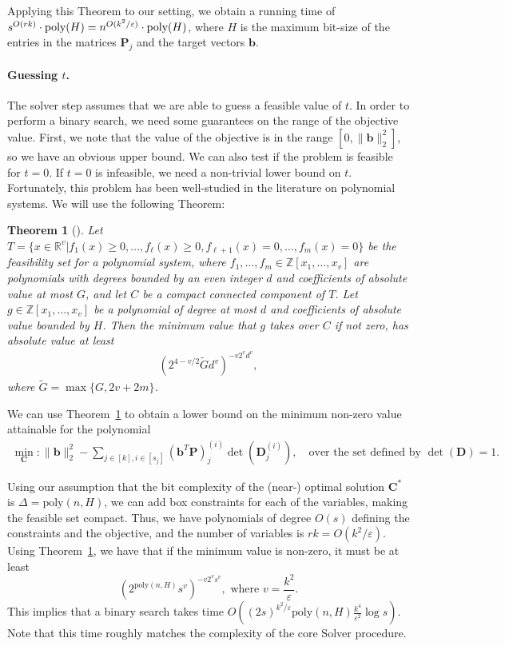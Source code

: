 \documentclass[11pt]{article}
\newcommand{\sumL}{\sum\limits}
\theoremstyle{plain}
\newtheorem{theorem}{Theorem}[section]
\theoremstyle{plain}
\theoremstyle{definition}
\theoremstyle{plain}
\theoremstyle{remark}
\newcommand{\RR}{\mathbb{R}}
\newcommand{\ZZ}{\mathbb{Z}}
\newcommand{\eps}{\varepsilon}
\begin{document}
Applying this Theorem to our setting, we obtain a running time of $s^{O(rk)} \cdot \text{poly}(H) = n^{O(k^2/\varepsilon)}\cdot \textnormal{poly}(H)$, where $H$ is the maximum bit-size of the entries in the matrices $\bm{P}_j$ and the target vectors $\bm{b}$. 

\paragraph{Guessing $t$.} The solver step assumes that we are able to guess a feasible value of $t$. In order to perform a binary search, we need some guarantees on the range of the objective value. First, we note that the value of the objective is in the range $[0,\|\bm{b}\|_2^2]$, so we have an obvious upper bound. We can also test if the problem is feasible for $t=0$. If $t=0$ is infeasible, we need a non-trivial lower bound on $t$. Fortunately, this problem has been well-studied in the literature on polynomial systems. We will use the following Theorem:

\begin{theorem}[\cite{JPT13}]
\label{thm:poly_system_lowerbound}
Let $T=\{x\in \RR^v | f_1(x)\geq 0, \dots, f_{\ell}(x)\geq 0, f_{\ell+1}(x)=0,\dots, f_{m}(x)=0\}$ be the feasibility set for a polynomial system, where $f_1,\dots,f_m \in \ZZ[x_1,\dots,x_v]$ are polynomials with degrees bounded by an even integer $d$ and coefficients of absolute value at most $G$, and let $C$ be a compact connected component of $T$. Let $g\in \ZZ[x_1,\dots,x_v]$ be a polynomial of degree at most $d$ and coefficients of absolute value bounded by $H$. Then the minimum value that $g$ takes over $C$ if not zero, has absolute value at least 
    \begin{align*}
        (2^{4-v/2}\tilde{G}d^v)^{-v2^vd^v},
    \end{align*}
    where $\tilde{G}=\max\{G,2v+2m\}$.
\end{theorem}

We can use Theorem~\ref{thm:poly_system_lowerbound} to obtain a lower bound on the minimum non-zero value attainable for the polynomial
\begin{align}
\label{eqn:min_granularity}    \min_{\bm{C}}: \|\bm{b}\|_2^2 - \sumL_{j\in [k], i\in [s_j]}(\bm{b}^T\bm{P})_j^{(i)}\det(\bm{D}_j^{(i)}), \quad \text{over the set defined by } \det(\bm{D})=1.
\end{align}

Using our assumption that the bit complexity of the (near-) optimal solution $\bm{C}^*$ is $\Delta = \text{poly}(n, H)$, we can add box constraints for each of the variables, making the feasible set compact. Thus, we have polynomials of degree $O(s)$ defining the constraints and the objective, and the number of variables is $rk = O(k^2/\eps)$. Using Theorem~\ref{thm:poly_system_lowerbound}, we have that if the minimum value is non-zero, it must be at least
\[  \left( 2^{\text{poly}(n,H)} s^v   \right)^{-v 2^v s^v},  \text{ where } v = \frac{k^2}{\eps}.  \]
This implies that a binary search takes time $O\left(  (2s)^{k^2/\eps} \text{poly}(n,H) \frac{k^4}{\eps^2} \log s \right)$.  Note that this time roughly matches the complexity of the core Solver procedure.
\end{document}
